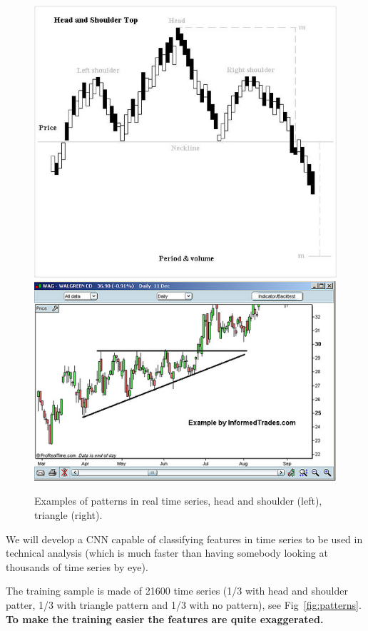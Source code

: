 \begin{figure}[htb]
\centering
\includegraphics[width=0.4\linewidth]{figures/H_and_s_top_new.jpg}\qquad
\includegraphics[width=0.4\linewidth]{figures/Triangle-ascending.jpg}
\caption{Examples of patterns in real time series, head and shoulder (left), triangle (right).}
    \label{fig:tech_ana}
\end{figure}

We will develop a CNN capable of classifying features in time series to be used in technical analysis (which is much faster than having somebody looking at thousands of time series by eye).

The training sample is made of 21600 time series (1/3 with head and shoulder patter, 1/3 with triangle pattern and 1/3 with no pattern), see Fig~\ref{fig:patterns}. \textbf{To make the training easier the features are quite exaggerated.}


